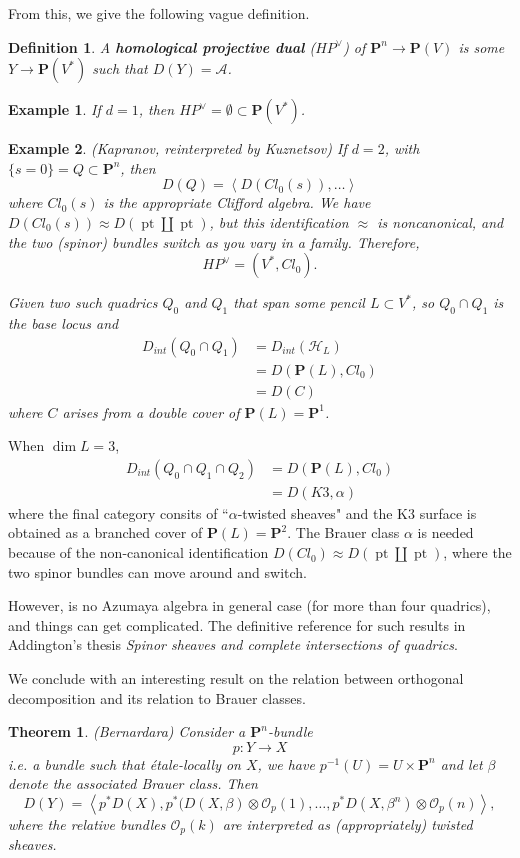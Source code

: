 \documentclass{amsart}
\newtheorem*{thm}{Theorem}
\newtheorem*{defn}{Definition}
\newtheorem*{ex}{Example}
\newcommand{\A}{\mathcal{A}}
\newcommand{\PP}{\textbf{P}}
\newcommand{\Oh}{\mathcal{O}}
\renewcommand{\H}{\mathcal{H}}
\DeclareMathOperator{\pt}{pt}
\begin{document}
From this, we give the following vague definition.

\begin{defn}
A \textbf{homological projective dual} ($HP^\vee$) of $\PP^n \to \PP(V)$ is some $Y \to \PP(V^*)$ such that $D(Y) = \A$. 
\end{defn}

\begin{ex}
If $d = 1$, then $HP^\vee = \emptyset \subset \PP(V^*)$.
\end{ex}

\begin{ex}(Kapranov, reinterpreted by Kuznetsov) 
If $d = 2$, with $\{s = 0\} = Q \subset \PP^n$, then
\[
D(Q) = \left<D(Cl_0(s)), \ldots\right>
\]
where $Cl_0(s)$ is the appropriate Clifford algebra. We have $D(Cl_0(s)) \approx D(\pt \amalg \pt)$, but this identification $\approx$ is noncanonical, and the two (spinor) bundles switch as you vary in a family. Therefore,
\[
HP^\vee = (V^*, Cl_0).
\]

Given two such quadrics $Q_0$ and $Q_1$ that span some pencil $L \subset V^*$, so $Q_0 \cap Q_1$ is the base locus and
\begin{align*}
D_{int}(Q_0 \cap Q_1) & = D_{int}(\H_L) \\
&= D(\PP(L), Cl_0) \\
&= D(C)
\end{align*}
where $C$ arises from a double cover of $\PP(L) = \PP^1$.
\end{ex}

When $\dim L =3$,
\begin{align*}
D_{int}(Q_0 \cap Q_1 \cap Q_2) &= D(\PP(L), Cl_0)\\
&= D(K3, \alpha)
\end{align*}
where the final category consits of ``$\alpha$-twisted sheaves" and the K3 surface is obtained as a branched cover of $\PP(L) = \PP^2$. The Brauer class $\alpha$ is needed because of the non-canonical identification $D(Cl_0) \approx D(\pt \amalg \pt)$, where the two spinor bundles can move around and switch.

However, is no Azumaya algebra in general case (for more than four quadrics), and things can get complicated. The definitive reference for such results in Addington's thesis \textit{Spinor sheaves and complete intersections of quadrics}.



We conclude with an interesting result on the relation between orthogonal decomposition and its relation to Brauer classes.

\begin{thm}(Bernardara)
Consider a $\PP^n$-bundle
\[
p: Y \to X
\]
i.e. a bundle such that \'etale-locally on $X$, we have $p^{-1}(U) = U \times \PP^n$ and let $\beta$ denote the associated Brauer class.  Then
\[
D(Y) = \left<p^*D(X), p^*(D(X, \beta) \otimes \Oh_p(1), \ldots, p^*D(X, \beta^n) \otimes \Oh_p(n)\right>,
\]
where the relative bundles $\Oh_p(k)$ are interpreted as (appropriately) twisted sheaves.
\end{thm}
\end{document}
